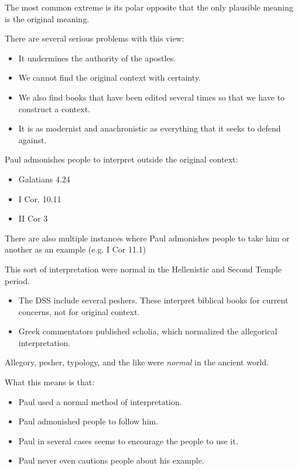 \documentclass{beamer}
\begin{document}
\begin{frame}
  The most common extreme is its polar opposite that the only plausible meaning is the original meaning.
\end{frame}

\begin{frame}
  There are several serious problems with this view:\pause
  \begin{itemize}
	\item It undermines the authority of the apostles.\pause
	\item We cannot find the original context with certainty.\pause
	\item We also find books that have been edited several times so that we have to construct a context.\pause
	\item It is as modernist and anachronistic as everything that it seeks to defend against.
  \end{itemize}
\end{frame}

\begin{frame}
  Paul admonishes people to interpret outside the original context:\pause
  \begin{itemize}
	\item Galatians 4.24\pause
	\item I Cor. 10.11\pause
	\item II Cor 3
  \end{itemize}
\end{frame}

\begin{frame}
  There are also multiple instances where Paul admonishes people to take him or another as an example (e.g. I Cor 11.1)
\end{frame}

\begin{frame}
  This sort of interpretation were normal in the Hellenistic and Second Temple period.\pause
  \begin{itemize}
	\item The DSS include several peshers.
	  These interpret biblical books for current concerns, not for original context.\pause
	\item Greek commentators published scholia, which normalized the allegorical interpretation.\pause
  \end{itemize}
  Allegory, pesher, typology, and the like were \emph{normal} in the ancient world.
\end{frame}

\begin{frame}
  What this means is that:\pause
  \begin{itemize}
	\item Paul used a normal method of interpretation.\pause
	\item Paul admonished people to follow him.\pause
	\item Paul in several cases seems to encourage the people to use it.\pause
	\item Paul never even cautions people about his example.
  \end{itemize}
\end{frame}
\end{document}
